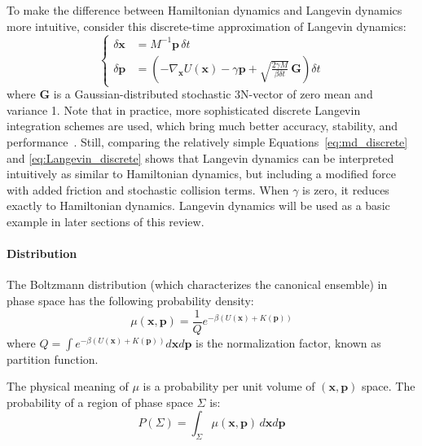 \documentclass[9pt,review]{livecoms}
\newcommand{\vx}{\mathbf{x}}
\newcommand{\vp}{\mathbf{p}}
\begin{document}
To make the difference between Hamiltonian dynamics and Langevin dynamics more intuitive, consider this discrete-time approximation of Langevin dynamics:
\begin{equation}
\left\{
\begin{array}{ll}
    \delta\vx &= M^{-1} \vp \, \delta t \\
    \delta\vp &= \left(-\nabla_\vx U(\vx) - \gamma \vp + \sqrt{ \frac{2 \gamma M}{ \beta \delta t}} \, \mathbf{G} \right) \delta t
    \label{eq:Langevin_discrete}
\end{array}
\right.
\end{equation}
where $\mathbf{G}$ is a Gaussian-distributed stochastic 3N-vector of zero mean and variance 1.
Note that in practice, more sophisticated discrete Langevin integration schemes are used, which bring much better accuracy, stability, and performance~\cite{Skeel2002, Leimkuhler2012}.
Still, comparing the relatively simple Equations~\ref{eq:md_discrete} and \ref{eq:Langevin_discrete} shows that Langevin dynamics can be interpreted intuitively as similar to Hamiltonian dynamics, but including a modified force with added friction and stochastic collision terms. When $\gamma$ is zero, it reduces exactly to Hamiltonian dynamics.
Langevin dynamics will be used as a basic example in later sections of this review.

\hypertarget{ref:Distribution}{\paragraph{Distribution}}

The Boltzmann distribution (which characterizes the canonical ensemble) in phase space has the following probability density:
\begin{equation}
\mu(\vx, \vp) = \frac{1}{Q} e^{-\beta (U(\vx) + K(\vp))}
\label{eq:BoltzmannDistr}
\end{equation}
where $ \displaystyle Q = \int e^{-\beta (U(\vx) + K(\vp))} d\vx d\vp$ is the normalization factor, known as partition function.

The physical meaning of $\mu$ is a probability per unit volume of $(\vx, \vp)$ space. The probability of a region of phase space $\Sigma$ is:
\begin{equation}
    P(\Sigma) = \int_\Sigma \mu(\vx, \vp) \, d\vx d\vp
\end{equation}
\end{document}
